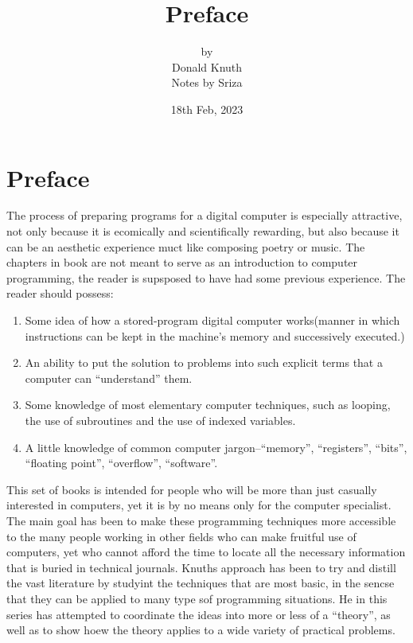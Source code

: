 \documentclass{article}
\title{Preface}
\author{by\\Donald Knuth \vspace{0.5in} \\Notes by Sriza}
\date{18th Feb, 2023}
\begin{document}
\maketitle
\thispagestyle{empty}
\newpage

\tableofcontents
\thispagestyle{empty}
\newpage

\section{Preface}
\setcounter{page}{1}
The process of preparing programs for a digital computer is especially attractive, not only because it is ecomically and scientifically rewarding, but also because it can be an aesthetic experience muct like composing poetry or music. The chapters in book are not meant to serve as an introduction to computer programming, the reader is supsposed to have had some previous experience. The reader should possess:
\begin{enumerate}
    \item Some idea of how a stored-program digital computer works(manner in which instructions can be kept in the machine's memory and successively executed.)
    \item An ability to put the solution to problems into such explicit terms that a computer can ``understand'' them.
    \item Some knowledge of most elementary computer techniques, such as looping, the use of subroutines and the use of indexed variables.
    \item A little knowledge of common computer jargon--``memory'', ``registers'', ``bits'', ``floating point'', ``overflow'', ``software''.
\end{enumerate}

This set of books is intended for people who will be more than just casually interested in computers, yet it is by no means only for the computer specialist. The main goal has been to make these programming techniques more accessible to the many people working in other fields who can make fruitful use of computers, yet who cannot afford the time to locate all the necessary information that is buried in technical journals. Knuths approach has been to try and distill the vast literature by studyint the techniques that are most basic, in the sencse that they can be applied to many type sof programming situations. He in this series has attempted to coordinate the ideas into more or less of a ``theory'', as well as to show hoew the theory applies to a wide variety of practical problems.
\end{document}
